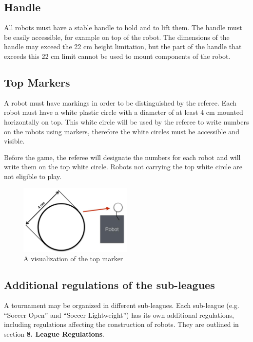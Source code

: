 \documentclass{article}
\begin{document}
\subsection{ Handle \label{ref-024}}

All robots must have a stable handle to hold and to lift them. The handle must
be easily accessible, for example on top of the robot. The dimensions of the
handle may exceed the 22 cm height limitation, but the part of the handle that
exceeds this 22 cm limit cannot be used to mount components of the robot.

\subsection{ Top Markers\label{ref-025}}

A robot must have markings in order to be distinguished by the referee. Each
robot must have a white plastic circle with a diameter of at least 4 cm mounted
horizontally on top. This white circle will be used by the referee to write
numbers on the robots using markers, therefore the white circles must be
accessible and visible.

Before the game, the referee will designate the numbers for each robot and will
write them on the top white circle. Robots not carrying the top white circle
are not eligible to play.

\begin{figure}[H]
    \centering
    \includegraphics[width=0.5\textwidth]{media/image4.jpeg}
    \caption{A visualization of the top marker}
    \label{fig:top_marker}
\end{figure}

\subsection{ Additional regulations of the sub-leagues \label{ref-026}}

A tournament may be organized in different sub-leagues. Each sub-league (e.g.
``Soccer Open'' and ``Soccer Lightweight'') has its own additional regulations,
including regulations affecting the construction of robots. They are outlined
in section \textbf{8. League Regulations}.
\end{document}
